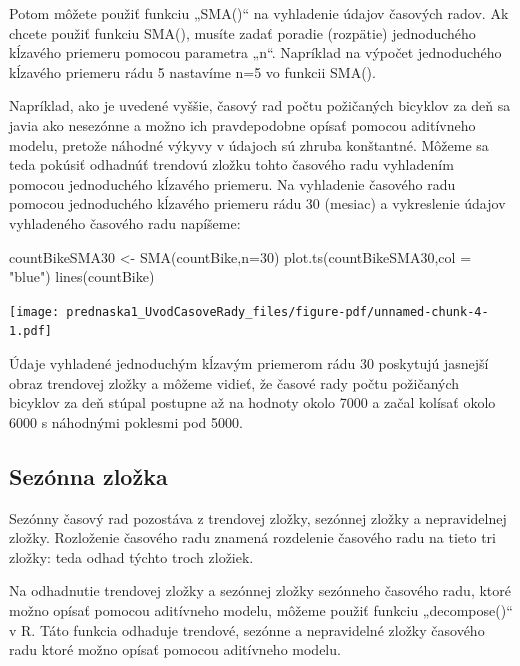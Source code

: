 \documentclass[
  letterpaper,
  DIV=11,
  numbers=noendperiod]{scrreprt}
\newenvironment{Shaded}{\begin{snugshade}}{\end{snugshade}}
\newcommand{\AttributeTok}[1]{\textcolor[rgb]{0.40,0.45,0.13}{#1}}
\newcommand{\DecValTok}[1]{\textcolor[rgb]{0.68,0.00,0.00}{#1}}
\newcommand{\FunctionTok}[1]{\textcolor[rgb]{0.28,0.35,0.67}{#1}}
\newcommand{\NormalTok}[1]{\textcolor[rgb]{0.00,0.23,0.31}{#1}}
\newcommand{\OtherTok}[1]{\textcolor[rgb]{0.00,0.23,0.31}{#1}}
\newcommand{\StringTok}[1]{\textcolor[rgb]{0.13,0.47,0.30}{#1}}
\begin{document}
Potom môžete použiť funkciu „SMA()`` na vyhladenie údajov časových
radov. Ak chcete použiť funkciu SMA(), musíte zadať poradie (rozpätie)
jednoduchého kĺzavého priemeru pomocou parametra „n``. Napríklad na
výpočet jednoduchého kĺzavého priemeru rádu 5 nastavíme n=5 vo funkcii
SMA().

Napríklad, ako je uvedené vyššie, časový rad počtu požičaných bicyklov
za deň sa javia ako nesezónne a možno ich pravdepodobne opísať pomocou
aditívneho modelu, pretože náhodné výkyvy v údajoch sú zhruba
konštantné. Môžeme sa teda pokúsiť odhadnúť trendovú zložku tohto
časového radu vyhladením pomocou jednoduchého kĺzavého priemeru. Na
vyhladenie časového radu pomocou jednoduchého kĺzavého priemeru rádu 30
(mesiac) a vykreslenie údajov vyhladeného časového radu napíšeme:

\begin{Shaded}
\begin{Highlighting}[]
\NormalTok{countBikeSMA30 }\OtherTok{\textless{}{-}} \FunctionTok{SMA}\NormalTok{(countBike,}\AttributeTok{n=}\DecValTok{30}\NormalTok{)}
\FunctionTok{plot.ts}\NormalTok{(countBikeSMA30,}\AttributeTok{col =} \StringTok{"blue"}\NormalTok{)}
\FunctionTok{lines}\NormalTok{(countBike)}
\end{Highlighting}
\end{Shaded}

\texttt{[image: prednaska1\_UvodCasoveRady\_files/figure-pdf/unnamed-chunk-4-1.pdf]}

Údaje vyhladené jednoduchým kĺzavým priemerom rádu 30 poskytujú jasnejší
obraz trendovej zložky a môžeme vidieť, že časové rady počtu požičaných
bicyklov za deň stúpal postupne až na hodnoty okolo 7000 a začal kolísať
okolo 6000 s náhodnými poklesmi pod 5000.

\subsection{Sezónna zložka}\label{sezuxf3nna-zloux17eka}

Sezónny časový rad pozostáva z trendovej zložky, sezónnej zložky a
nepravidelnej zložky. Rozloženie časového radu znamená rozdelenie
časového radu na tieto tri zložky: teda odhad týchto troch zložiek.

Na odhadnutie trendovej zložky a sezónnej zložky sezónneho časového
radu, ktoré možno opísať pomocou aditívneho modelu, môžeme použiť
funkciu „decompose()`` v R. Táto funkcia odhaduje trendové, sezónne a
nepravidelné zložky časového radu ktoré možno opísať pomocou aditívneho
modelu.
\end{document}
